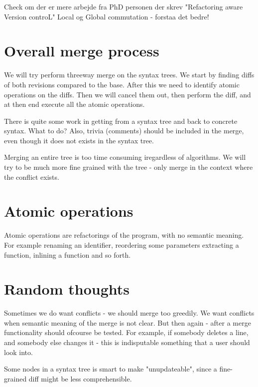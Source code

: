\documentclass[12pt]{article}
\begin{document}
\maketitle

Check om der er mere arbejde fra PhD personen der skrev "Refactoring aware Version controL"
Local og Global commutation - forstaa det bedre!

\section{Overall merge process}
We will try perform threeway merge on the syntax trees. We start by finding diffs of both revisions compared to the base. After this we need to identify atomic operations on the diffs. Then we will cancel them out, then perform the diff, and at then end execute all the atomic operations.

There is quite some work in getting from a syntax tree and back to concrete syntax. What to do? Also, trivia (comments) should be included in the merge, even though it does not exists in the syntax tree.

Merging an entire tree is too time consuming iregardless of algorithms. We will try to be much more fine grained with the tree - only merge in the context where the conflict exists.

\section{Atomic operations}
Atomic operations are refactorings of the program, with no semantic meaning. For example renaming an identifier, reordering some parameters extracting a function, inlining a function and so forth.

\section{Random thoughts}
Sometimes we do want conflicts - we should merge too greedily. We want conflicts when semantic meaning of the merge is not clear. But then again - after a merge functionality should ofcourse be tested. For example, if somebody deletes a line, and somebody else changes it - this is indisputable something that a user should look into.

Some nodes in a syntax tree is smart to make "unupdateable", since a fine-grained diff might be less comprehensible.	







\end{document}
